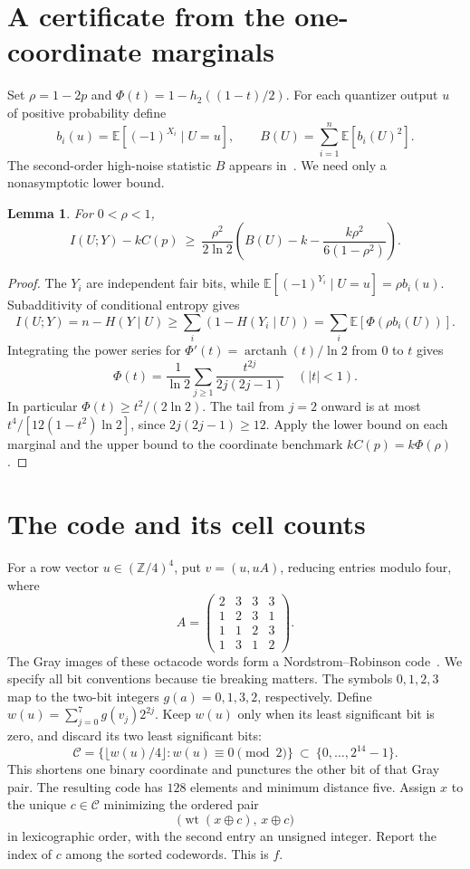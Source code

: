 \documentclass[11pt]{article}
\newtheorem{lemma}{Lemma}
\newcommand{\E}{\mathbb E}
\newcommand{\wt}{\operatorname{wt}}
\begin{document}
\section{A certificate from the one-coordinate marginals}
Set $\rho=1-2p$ and $\Phi(t)=1-h_2((1-t)/2)$. For each quantizer output $u$ of positive probability define
\[
 b_i(u)=\E[(-1)^{X_i}\mid U=u],\qquad
 B(U)=\sum_{i=1}^n\E[b_i(U)^2].
\]
The second-order high-noise statistic $B$ appears in~\cite{mb}. We need only a nonasymptotic lower bound.
\begin{lemma}\label{l}
For $0<\rho<1$,
\[
 I(U;Y)-kC(p)\ \ge\
 \frac{\rho^2}{2\ln 2}
 \left(B(U)-k-\frac{k\rho^2}{6(1-\rho^2)}\right).
\]
\end{lemma}
\begin{proof}
The $Y_i$ are independent fair bits, while $\E[(-1)^{Y_i}\mid U=u]=\rho b_i(u)$. Subadditivity of conditional entropy gives
\[
 I(U;Y)=n-H(Y\mid U)\ge\sum_i (1-H(Y_i\mid U))
 =\sum_i\E[\Phi(\rho b_i(U))].
\]
Integrating the power series for $\Phi'(t)=\operatorname{arctanh}(t)/\ln 2$ from $0$ to $t$ gives
\[
 \Phi(t)=\frac1{\ln2}\sum_{j\ge1}\frac{t^{2j}}{2j(2j-1)}
 \quad(|t|<1).
\]
In particular $\Phi(t)\ge t^2/(2\ln2)$. The tail from $j=2$ onward is at most $t^4/[12(1-t^2)\ln2]$, since $2j(2j-1)\ge12$. Apply the lower bound on each marginal and the upper bound to the coordinate benchmark $kC(p)=k\Phi(\rho)$.
\end{proof}

\section{The code and its cell counts}
For a row vector $u\in(\mathbb Z/4)^4$, put $v=(u,uA)$, reducing entries modulo four, where
\[
 A=\begin{pmatrix}
 2&3&3&3\\1&2&3&1\\1&1&2&3\\1&3&1&2
 \end{pmatrix}.
\]
The Gray images of these octacode words form a Nordstrom--Robinson code~\cite{nr}. We specify all bit conventions because tie breaking matters. The symbols $0,1,2,3$ map to the two-bit integers $g(a)=0,1,3,2$, respectively. Define $w(u)=\sum_{j=0}^7 g(v_j)2^{2j}$. Keep $w(u)$ only when its least significant bit is zero, and discard its two least significant bits:
\[
 \mathcal C=\{\lfloor w(u)/4\rfloor : w(u)\equiv0\pmod2\}
 \ \subset\ \{0,\ldots,2^{14}-1\}.
\]
This shortens one binary coordinate and punctures the other bit of that Gray pair. The resulting code has $128$ elements and minimum distance five. Assign $x$ to the unique $c\in\mathcal C$ minimizing the ordered pair
\[
 \bigl(\wt(x\mathbin{\oplus}c),\,x\mathbin{\oplus}c\bigr)
\]
in lexicographic order, with the second entry an unsigned integer. Report the index of $c$ among the sorted codewords. This is $f$.
\end{document}
